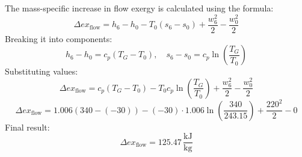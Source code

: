 The mass-specific increase in flow exergy is calculated using the formula:  
\[
\Delta ex_{\text{flow}} = h_6 - h_0 - T_0 (s_6 - s_0) + \frac{w_6^2}{2} - \frac{w_0^2}{2}
\]  
Breaking it into components:  
\[
h_6 - h_0 = c_p (T_G - T_0), \quad s_6 - s_0 = c_p \ln \left( \frac{T_G}{T_0} \right)
\]  
Substituting values:  
\[
\Delta ex_{\text{flow}} = c_p (T_G - T_0) - T_0 c_p \ln \left( \frac{T_G}{T_0} \right) + \frac{w_6^2}{2} - \frac{w_0^2}{2}
\]  
\[
\Delta ex_{\text{flow}} = 1.006 \left( 340 - (-30) \right) - (-30) \cdot 1.006 \ln \left( \frac{340}{243.15} \right) + \frac{220^2}{2} - 0
\]  
Final result:  
\[
\Delta ex_{\text{flow}} = 125.47 \, \frac{\text{kJ}}{\text{kg}}
\]